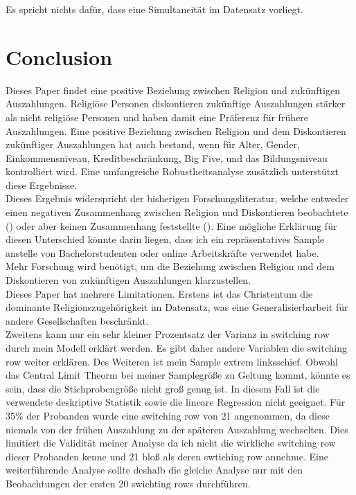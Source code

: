 \documentclass[11pt,a4paper]{article}
\begin{document}
Es spricht nichts dafür, dass eine Simultaneität im Datensatz vorliegt.

\section{Conclusion}
Dieses Paper findet eine positive Beziehung zwischen Religion und zukünftigen Auszahlungen. Religiöse Personen diskontieren zukünftige Auszahlungen stärker als nicht religiöse Personen und haben damit eine Präferenz für frühere Auszahlungen. Eine positive Beziehung zwischen Religion und dem Diskontieren zukünftiger Auszahlungen hat auch bestand, wenn für Alter, Gender, Einkommensniveau, Kreditbeschränkung, Big Five, und das Bildungsniveau kontrolliert wird. Eine umfangreiche Robustheitsanalyse zusätzlich unterstützt  diese Ergebnisse.\\
Dieses Ergebnis widerspricht der bisherigen Forschungsliteratur, welche entweder einen negativen Zusammenhang zwischen Religion und Diskontieren beobachtete (\textcite{carter2012religious}) oder aber keinen Zusammenhang feststellte (\textcite{thornton2015divine, benjamin2013religious}). Eine mögliche Erklärung für diesen Unterschied könnte darin liegen, dass ich ein repräsentatives Sample anstelle von Bachelorstudenten oder online Arbeitskräfte verwendet habe.\\
Mehr Forschung wird benötigt, um die Beziehung zwischen Religion und dem Diskontieren von zukünftigen Auszahlungen klarzustellen.\\






Dieses Paper hat mehrere Limitationen. Erstens ist das Christentum die dominante Religionszugehörigkeit im Datensatz, was eine Generalisierbarbeit für andere Gesellschaften beschränkt.\\
Zweitens kann nur ein sehr kleiner Prozentsatz der Varianz in switching row durch mein Modell erklärt werden. Es gibt daher andere Variablen die switching row weiter erklären. Des Weiteren ist mein Sample extrem linksschief. Obwohl das Central Limit Theorm bei meiner Samplegröße zu Geltung kommt, könnte es sein, dass die Stichprobengröße nicht groß genug ist. In diesem Fall ist die verwendete deskriptive Statistik sowie die lineare Regression nicht geeignet. Für 35\% der Probanden wurde eine switching row von 21 angenommen, da diese niemals von der frühen Auszahlung zu der späteren Auszahlung wechselten. Dies limitiert die Validität meiner Analyse da ich nicht die wirkliche switching row dieser Probanden kenne und 21 bloß als deren swtiching row annehme. Eine weiterführende Analyse sollte deshalb die gleiche Analyse nur mit den Beobachtungen der ersten 20 swichting rows durchführen.\\
\end{document}
